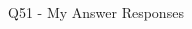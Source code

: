 \begin{frame}{Q51 - My Answer Responses}
\begin{multicols}{2}
    \begin{minipage}{\linewidth}
    \RaggedRight\textbf{\tiny {}} \\ 
    \vspace{4.00pt}
    \end{minipage}
    \vspace{10pt}

    \end{multicols}
\end{frame}


